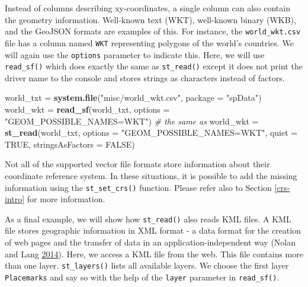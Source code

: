 \documentclass[]{krantz}
\newenvironment{Shaded}{\begin{snugshade}}{\end{snugshade}}
\newcommand{\CommentTok}[1]{\textcolor[rgb]{0.37,0.37,0.37}{\textit{#1}}}
\newcommand{\DataTypeTok}[1]{\textcolor[rgb]{0.27,0.27,0.27}{#1}}
\newcommand{\KeywordTok}[1]{\textcolor[rgb]{0.27,0.27,0.27}{\textbf{#1}}}
\newcommand{\NormalTok}[1]{#1}
\newcommand{\OtherTok}[1]{\textcolor[rgb]{0.37,0.37,0.37}{#1}}
\newcommand{\StringTok}[1]{\textcolor[rgb]{0.5,0.5,0.5}{#1}}
\let\BeginKnitrBlock\begin \let\EndKnitrBlock\end
\begin{document}
Instead of columns describing xy-coordinates, a single column can also contain the geometry information.
Well-known text (WKT), well-known binary (WKB), and the GeoJSON formats are examples of this.
For instance, the \texttt{world\_wkt.csv} file has a column named \texttt{WKT} representing polygons of the world's countries.
We will again use the \texttt{options} parameter to indicate this.
Here, we will use \texttt{read\_sf()} which does exactly the same as \texttt{st\_read()} except it does not print the driver name to the console and stores strings as characters instead of factors.

\begin{Shaded}
\begin{Highlighting}[]
\NormalTok{world_txt =}\StringTok{ }\KeywordTok{system.file}\NormalTok{(}\StringTok{"misc/world_wkt.csv"}\NormalTok{, }\DataTypeTok{package =} \StringTok{"spData"}\NormalTok{)}
\NormalTok{world_wkt =}\StringTok{ }\KeywordTok{read_sf}\NormalTok{(world_txt, }\DataTypeTok{options =} \StringTok{"GEOM_POSSIBLE_NAMES=WKT"}\NormalTok{)}
\CommentTok{# the same as}
\NormalTok{world_wkt =}\StringTok{ }\KeywordTok{st_read}\NormalTok{(world_txt, }\DataTypeTok{options =} \StringTok{"GEOM_POSSIBLE_NAMES=WKT"}\NormalTok{, }
                    \DataTypeTok{quiet =} \OtherTok{TRUE}\NormalTok{, }\DataTypeTok{stringsAsFactors =} \OtherTok{FALSE}\NormalTok{)}
\end{Highlighting}
\end{Shaded}

\BeginKnitrBlock{rmdnote}
Not all of the supported vector file formats store information about their coordinate reference system.
In these situations, it is possible to add the missing information using the \texttt{st\_set\_crs()} function.
Please refer also to Section \ref{crs-intro} for more information.
\EndKnitrBlock{rmdnote}

As a final example, we will show how \texttt{st\_read()} also reads KML files.
A KML file stores geographic information in XML format - a data format for the creation of web pages and the transfer of data in an application-independent way (Nolan and Lang \protect\hyperlink{ref-nolan_xml_2014}{2014}).
Here, we access a KML file from the web.
This file contains more than one layer.
\texttt{st\_layers()} lists all available layers.
We choose the first layer \texttt{Placemarks} and say so with the help of the \texttt{layer} parameter in \texttt{read\_sf()}.
\end{document}
